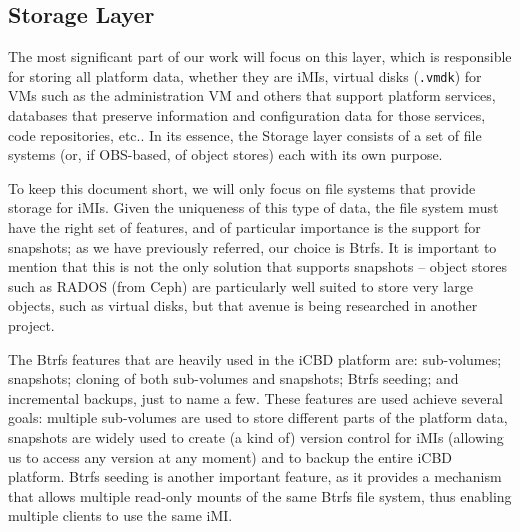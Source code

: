 


\subsection{Storage Layer}
\label{sub:icbd_storage_layer}

The most significant part of our work will focus on this layer, which is responsible for storing all platform data, whether they are iMIs, virtual disks (\texttt{.vmdk}) for VMs such as the administration VM and others that support platform services, databases that preserve information and configuration data for those services, code repositories, etc.. In its essence, the Storage layer consists of a set of file systems (or, if OBS-based, of object stores) each with its own purpose.

To keep this document short, we will only focus on file systems that provide storage for iMIs. Given the uniqueness of this type of data, the file system must have the right set of features, and of particular importance is the support for snapshots; as we have previously referred, our choice is Btrfs. It is important to mention that this is not the only solution that supports snapshots – object stores such as RADOS (from Ceph) are particularly well suited to store very large objects, such as virtual disks, but that avenue is being researched in another project. 

The Btrfs features that are heavily used in the iCBD platform are: sub-volumes; snapshots; cloning of both sub-volumes and snapshots; Btrfs seeding; and incremental backups, just to name a few. These features are used achieve several goals: multiple sub-volumes are used to store different parts of the platform data, snapshots are widely used to create (a kind of) version control for iMIs (allowing us to access any version at any moment) and to backup the entire iCBD platform. Btrfs seeding is another important feature, as it provides a mechanism that allows multiple read-only mounts of the same Btrfs file system, thus enabling multiple clients to use the same iMI.

